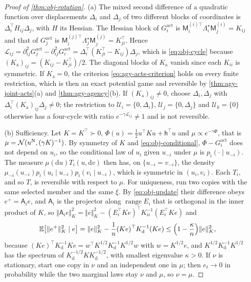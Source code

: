\begin{proof}[Proof of \cref{thm:obj-rotation}]
(a) The mixed second difference of a quadratic function over displacements $\Delta_i$ and $\Delta_j$ of two different blocks of coordinates is $\Delta_i^\top H_{ij}\Delta_j$, with $H$ its Hessian. The Hessian block of $G^{\mathrm{act}}_i$ is $\mathsf M^{(i)\top}_i\Lambda^\star_i\mathsf M^{(i)}_j=K_{ij}$ and that of $G^{\mathrm{act}}_j$ is $\mathsf M^{(j)\top}_i\Lambda^\star_j\mathsf M^{(j)}_j=K_{ji}^\top$. Hence $\mathcal L_{ij}=\partial^2_{ij}G^{\mathrm{act}}_j-\partial^2_{ij}G^{\mathrm{act}}_i=\Delta_i^\top(K_{ji}^\top-K_{ij})\Delta_j$, which is \eqref{eq:obj-cycle} because $(K_{\mathrm a})_{ij}=(K_{ij}-K_{ji}^\top)/2$. The diagonal blocks of $K_{\mathrm a}$ vanish since each $K_{ii}$ is symmetric. If $K_{\mathrm a}=0$, the criterion \eqref{eq:agy-acts-criterion} holds on every finite restriction, which is then an exact potential game and reversible by \cref{thm:agy-joint-acts}(a) and \cref{thm:agy-agency}(b). If $(K_{\mathrm a})_{ij}\neq0$, choose $\Delta_i,\Delta_j$ with $\Delta_i^\top(K_{\mathrm a})_{ij}\Delta_j\neq0$; the restriction to $\mathcal U_i=\{0,\Delta_i\}$, $\mathcal U_j=\{0,\Delta_j\}$ and $\mathcal U_k=\{0\}$ otherwise has a four-cycle with ratio $e^{-\gamma\mathcal L_{ij}}\neq1$ and is not reversible.

(b) Sufficiency. Let $K=K^\top\succ0$, $\Phi(u)=\frac12u^\top Ku+\mathsf h^\top u$ and $\mu\propto e^{-\gamma\Phi}$, that is $\mu=\mathcal{N}(u^{\mathrm N},(\gamma K)^{-1})$. By symmetry of $K$ and \eqref{eq:obj-conditional}, $\Phi-G^{\mathrm{act}}_i$ does not depend on $u_i$, so the conditional law of $u_i$ given $u_{-i}$ under $\mu$ is $p_i(\cdot\mid u_{-i})$. The measure $\mu(\mathrm du)T_i(u,\mathrm dv)$ then has, on $\{u_{-i}=v_{-i}\}$, the density $\mu_{-i}(u_{-i})p_i(u_i\mid u_{-i})p_i(v_i\mid u_{-i})$, which is symmetric in $(u_i,v_i)$. Each $T_i$, and so $T$, is reversible with respect to $\mu$. For uniqueness, run two copies with the same selected member and the same $\xi$. By \eqref{eq:obj-update} their difference obeys $e^+=\mathsf A_ie$, and $\mathsf A_i$ is the projector along $\operatorname{range}E_i$ that is orthogonal in the inner product of $K$, so $\Vert\mathsf A_ie\Vert_K^2=\Vert e\Vert_K^2-(E_i^\top Ke)^\top K_{ii}^{-1}(E_i^\top Ke)$ and
\begin{equation}\label{eq:obj-coupling}
\mathbb{E}\bigl[\Vert e^+\Vert_K^2\mid e\bigr]=\Vert e\Vert_K^2-\frac1n(Ke)^\top K_{\mathrm d}^{-1}(Ke)\le\Bigl(1-\frac\kappa n\Bigr)\Vert e\Vert_K^2,
\end{equation}
because $(Ke)^\top K_{\mathrm d}^{-1}Ke=w^\top K^{1/2}K_{\mathrm d}^{-1}K^{1/2}w$ with $w=K^{1/2}e$, and $K^{1/2}K_{\mathrm d}^{-1}K^{1/2}$ has the spectrum of $K_{\mathrm d}^{-1/2}KK_{\mathrm d}^{-1/2}$, with smallest eigenvalue $\kappa>0$. If $\nu$ is stationary, start one copy in $\nu$ and an independent one in $\mu$; then $e_t\to0$ in probability while the two marginal laws stay $\nu$ and $\mu$, so $\nu=\mu$.


\end{proof}
